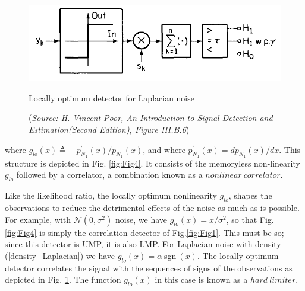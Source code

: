 \documentclass[a4paper,english,12pt]{article}
\begin{document}
\begin{exmp}
\begin{figure}[h]
\centering
\captionsetup{justification=centering}
\includegraphics[width=0.8\linewidth]{Figures/lec10Fig5}
\caption{Locally optimum detector for Laplacian noise}
\caption*{\footnotesize(\textit{Source: H. Vincent Poor, An Introduction to Signal Detection and Estimation(Second Edition), Figure	 III.B.6})}
\label{fig:Fig5}
\end{figure}
where $g_{lo}(x)\triangleq-\ p_{N_{1}}^\prime(x)/p_{N_{1}}(x)$, and where $p_{N_{1}}^\prime(x)=dp_{N_{1}}(x)/dx$. This structure is depicted in  Fig. \ref{fig:Fig4}. It consists of the memoryless non-linearity $g_{lo}$ followed by a correlator, a combination known as a $nonlinear\ correlator$.

Like the likelihood ratio, the locally optimum nonlinearity $g_{lo}$, shapes the observations to reduce the detrimental effects of the noise as much as is possible. For example, with $\mathcal{N}(0,\sigma^2)$ noise, we have $g_{lo}(x)=x/\sigma^2$, so that  Fig. \ref{fig:Fig4} is simply the correlation detector of Fig.\ref{fig:Fig1}. This must be so; since this detector is UMP, it is also LMP.
For Laplacian noise with density (\ref{density_Laplacian}) we have $g_{lo}(x)=\alpha\ $sgn$\ (x)$. The locally optimum detector correlates the signal with the sequences of signs of the observations as depicted in Fig. \ref{fig:Fig5}. The function $g_{lo}(x)$ in this case is known as a $hard\ limiter$.
\end{exmp}
\end{document}
